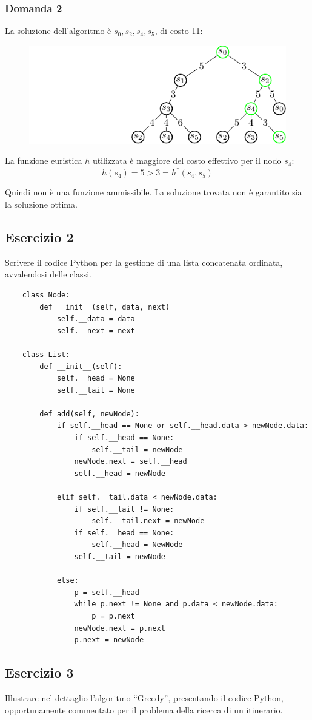 \documentclass{article}
\numberwithin{equation}{section}
\begin{document}
\subsubsection*{Domanda 2}

La soluzione dell'algoritmo è $s_0,s_2,s_4,s_5$, di costo 11:
\begin{figure}[H]%
    \centering%
    \includegraphics[trim={4cm 0 0 0}]{soluzione_esercitazione_1.pdf}%
\end{figure}

La funzione euristica $h$ utilizzata è maggiore del costo effettivo per il nodo $s_4$: 
\begin{equation}
    h(s_4)=5>3=h^*(s_4,s_5)
\end{equation}

Quindi non è una funzione ammissibile. La soluzione trovata 
non è garantito sia la soluzione ottima. 

\subsection*{Esercizio 2}

Scrivere il codice Python per la gestione di una lista concatenata ordinata, avvalendosi delle classi. \\
\begin{verbatim}
    class Node:
        def __init__(self, data, next)
            self.__data = data
            self.__next = next

    class List:
        def __init__(self):
            self.__head = None
            self.__tail = None

        def add(self, newNode):            
            if self.__head == None or self.__head.data > newNode.data:
                if self.__head == None:
                    self.__tail = newNode
                newNode.next = self.__head
                self.__head = newNode

            elif self.__tail.data < newNode.data:
                if self.__tail != None:
                    self.__tail.next = newNode
                if self.__head == None:
                    self.__head = NewNode
                self.__tail = newNode

            else:            
                p = self.__head
                while p.next != None and p.data < newNode.data:
                    p = p.next
                newNode.next = p.next
                p.next = newNode
\end{verbatim}

\subsection*{Esercizio 3}

Illustrare nel dettaglio l'algoritmo ``Greedy'', presentando il codice Python, opportunamente commentato per il problema della ricerca di un 
itinerario. 
\end{document}
